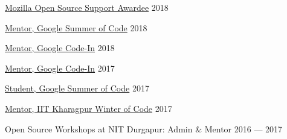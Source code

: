 \href{https://contributions.naveenkumarsangi.me/moss.pdf}{Mozilla Open Source Support Awardee} \hfill 2018

\href{https://contributions.naveenkumarsangi.me/gsoc-mentor.pdf}{Mentor, Google Summer of Code} \hfill 2018

\href{https://contributions.naveenkumarsangi.me/gci-mentor-2018.pdf}{Mentor, Google Code-In} \hfill 2018

\href{https://contributions.naveenkumarsangi.me/gci-mentor-2017.pdf}{Mentor, Google Code-In} \hfill 2017

\href{https://contributions.naveenkumarsangi.me/gsoc-mentor.pdf}{Student, Google Summer of Code} \hfill 2017

\href{https://contributions.naveenkumarsangi.me/kwoc.jpg}{Mentor, IIT Kharagpur Winter of Code} \hfill 2017

Open Source Workshops at NIT Durgapur: Admin \& Mentor \hfill 2016 --- 2017
